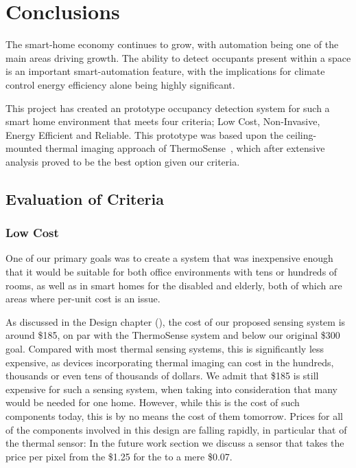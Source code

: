 \documentclass[../thesis/thesis.tex]{subfiles}
\begin{document}
 \chapter{Conclusions}

The smart-home economy continues to grow, with automation being one of the main areas driving growth. The ability to detect occupants present within a space is an important smart-automation feature, with the implications for climate control energy efficiency alone being highly significant.

This project has created an prototype occupancy detection system for such a smart home environment that meets four criteria; Low Cost, Non-Invasive, Energy Efficient and Reliable. This prototype was based upon the ceiling-mounted thermal imaging approach of ThermoSense~\cite{beltran2013thermosense}, which after extensive analysis proved to be the best option given our criteria.

\section{Evaluation of Criteria}

\subsection{Low Cost}
One of our primary goals was to create a system that was inexpensive enough that it would be suitable for both office environments with tens or hundreds of rooms, as well as in smart homes for the disabled and elderly, both of which are areas where per-unit cost is an issue.

As discussed in the Design chapter (), the cost of our proposed sensing system is around \$185, on par with the ThermoSense system and below our original \$300 goal. Compared with most thermal sensing systems, this is significantly less expensive, as devices incorporating thermal imaging can cost in the hundreds, thousands or even tens of thousands of dollars. We admit that \$185 is still expensive for such a sensing system, when taking into consideration that many would be needed for one home. However, while this is the cost of such components today, this is by no means the cost of them tomorrow. Prices for all of the components involved in this design are falling rapidly, in particular that of the thermal sensor: In the future work section we discuss a sensor that takes the price per pixel from the \$1.25 for the \mlx to a mere \$0.07.
\end{document}
